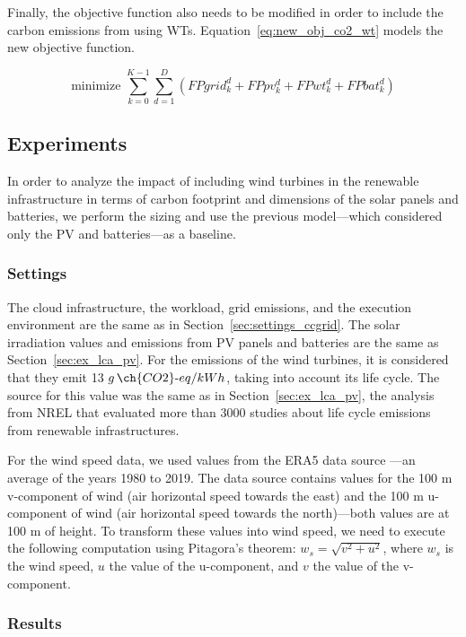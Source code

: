 Finally, the objective function also needs to be modified in order to include the carbon emissions from using WTs. Equation~\ref{eq:new_obj_co2_wt} models the new objective function.

\begin{equation} \label{eq:new_obj_co2_wt}
  \text{minimize }\sum_{k=0}^{K-1} \sum_{d=1}^D (FPgrid^d_k +  FPpv^d_k +  FPwt^d_k + FPbat^d_k) 
\end{equation}

\subsection{Experiments}

In order to analyze the impact of including wind turbines in the renewable infrastructure in terms of carbon footprint and dimensions of the solar panels and batteries, we perform the sizing and use the previous model---which considered only the PV and batteries---as a baseline.

\subsubsection{Settings}
\label{sec:settings_wt}

The cloud infrastructure, the workload, grid emissions, and the execution environment are the same as in Section~\ref{sec:settings_ccgrid}. The solar irradiation values and emissions from PV panels and batteries are the same as Section~\ref{sec:ex_lca_pv}. For the  emissions of the wind turbines, it is considered that they emit 13 $g\,\ch{CO2}\text{-}eq/kWh$, taking into account its life cycle. The source for this value was the same as in Section~\ref{sec:ex_lca_pv}, the analysis from NREL that evaluated more than 3000 studies about life cycle emissions from renewable infrastructures.

For the wind speed data, we used values from the ERA5 data source \cite{era5_wind_2022}---an average of the years 1980 to 2019. The data source contains values for the 100 m v-component of wind (air horizontal speed towards the east) and the 100 m u-component of wind (air horizontal speed towards the north)---both values are at 100 m of height. To transform these values into wind speed, we need to execute the following computation using Pitagora's theorem: $ w_s = \sqrt{ v^2 + u^2} $, where $w_s$ is the wind speed, $u$ the value of the u-component, and $v$ the value of the v-component.
\subsubsection{Results}
\label{sec:results_wt}

